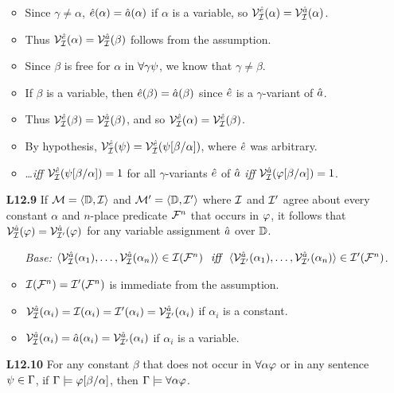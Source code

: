 \documentclass[a4paper, 11pt]{article} %
\begin{document}
\begin{enumerate}[labelsep=.1in]
\begin{itemize}
      \item Since $\gamma\neq\alpha$, $\hat{e}(\alpha)=\hat{a}(\alpha)$ if $\alpha$ is a variable, so $\mathcal{V}_{\mathcal{I}}^{\hat{e}}(\alpha)=\mathcal{V}_{\mathcal{I}}^{\hat{a}}(\alpha)$. 
      \item Thus $\mathcal{V}_{\mathcal{I}}^{\hat{e}}(\alpha)=\mathcal{V}_{\mathcal{I}}^{\hat{a}}(\beta)$ follows from the assumption. 
      \item Since $\beta$ is free for $\alpha$ in $\forall \gamma\psi$, we know that $\gamma\neq\beta$.
      \item If $\beta$ is a variable, then $\hat{e}(\beta)=\hat{a}(\beta)$ since $\hat{e}$ is a $\gamma$-variant of $\hat{a}$.
      \item Thus $\mathcal{V}_{\mathcal{I}}^{\hat{e}}(\beta)=\mathcal{V}_{\mathcal{I}}^{\hat{a}}(\beta)$, and so $\mathcal{V}_{\mathcal{I}}^{\hat{e}}(\alpha)=\mathcal{V}_{\mathcal{I}}^{\hat{e}}(\beta)$.
      \item By hypothesis, $\mathcal{V}_{\mathcal{I}}^{\hat{e}}(\psi)=\mathcal{V}_{\mathcal{I}}^{\hat{e}}(\psi[\beta/\alpha])$, where $\hat{e}$ was arbitrary.
      \item \ldots\textit{iff} $\mathcal{V}_{\mathcal{I}}^{\hat{e}}(\psi[\beta/\alpha])=1$ for all $\gamma$-variants $\hat{e}$ of $\hat{a}$ \textit{iff} $\mathcal{V}_{\mathcal{I}}^{\hat{a}}(\varphi[\beta/\alpha])=1$.
    \end{itemize}
  \item[\bf L12.9] If $\mathcal{M}=\langle\mathbb{D},\mathcal{I}\rangle$ and $\mathcal{M}'=\langle\mathbb{D},\mathcal{I}'\rangle$ where $\mathcal{I}$ and $\mathcal{I}'$ agree about every constant $\alpha$ and $n$-place predicate $\mathcal{F}^n$ that occurs in $\varphi$, it follows that $\mathcal{V}_{\mathcal{I}}^{\hat{a}}(\varphi)=\mathcal{V}_{\mathcal{I}'}^{\hat{a}}(\varphi)$ for any variable assignment $\hat{a}$ over $\mathbb{D}$.
    \begin{itemize}
      \item[\it Base:] $\langle\mathcal{V}_{\mathcal{I}}^{\hat{a}}(\alpha_1),\ldots,\mathcal{V}_{\mathcal{I}}^{\hat{a}}(\alpha_n)\rangle\in\mathcal{I}(\mathcal{F}^n) \textit{ ~iff~ } \langle\mathcal{V}_{\mathcal{I}'}^{\hat{a}}(\alpha_1),\ldots,\mathcal{V}_{\mathcal{I}'}^{\hat{a}}(\alpha_n)\rangle\in\mathcal{I}'(\mathcal{F}^n)$.
      \item $\mathcal{I}(\mathcal{F}^n)=\mathcal{I}'(\mathcal{F}^n)$ is immediate from the assumption.
      \item $\mathcal{V}_{\mathcal{I}}^{\hat{a}}(\alpha_i)=\mathcal{I}(\alpha_i)=\mathcal{I}'(\alpha_i)=\mathcal{V}_{\mathcal{I}'}^{\hat{a}}(\alpha_i)$ if $\alpha_i$ is a constant.
      \item $\mathcal{V}_{\mathcal{I}}^{\hat{a}}(\alpha_i)=\hat{a}(\alpha_i)=\mathcal{V}_{\mathcal{I}'}^{\hat{a}}(\alpha_i)$ if $\alpha_i$ is a variable.
    \end{itemize}
  \item[\bf L12.10] For any constant $\beta$ that does not occur in $\forall \alpha\varphi$ or in any sentence $\psi\in\Gamma$, if $\Gamma \models \varphi[\beta/\alpha]$, then $\Gamma \models \forall \alpha\varphi$.

\end{enumerate}
\end{document}
